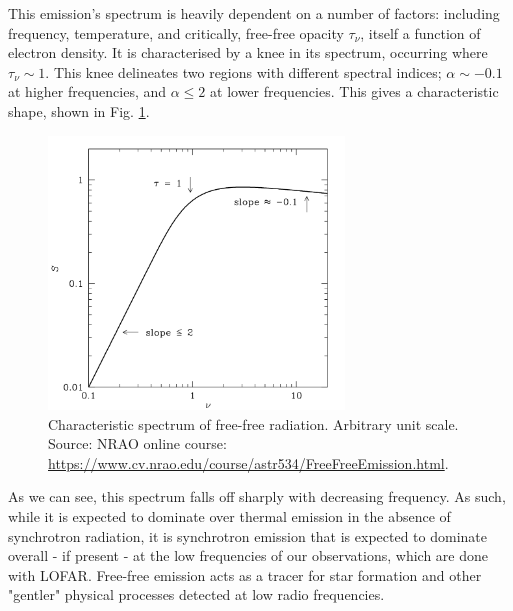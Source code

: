 \pg
This emission's spectrum is heavily dependent on a number of factors: including frequency, temperature, and critically, free-free opacity $\tau_\nu$, itself a function of electron density. It is characterised by a knee in its spectrum, occurring where $\tau_\nu\sim 1$. This knee delineates two regions with different spectral indices; $\alpha \sim -0.1$ at higher frequencies, and $\alpha \leq 2$ at lower frequencies. This gives a characteristic shape, shown in Fig. \ref{plot.freefree.spectrum}.
\begin{figure}[!h]
\centering
\includegraphics[width=0.7\textwidth]{images/freefree.png}
\caption{\label{plot.freefree.spectrum} Characteristic spectrum of free-free radiation. Arbitrary unit scale. Source: NRAO online course: \url{https://www.cv.nrao.edu/course/astr534/FreeFreeEmission.html}.}
\end{figure}

\pg
As we can see, this spectrum falls off sharply with decreasing frequency. As such, while it is expected to dominate over thermal emission in the absence of synchrotron radiation, it is synchrotron emission that is expected to dominate overall - if present - at the low frequencies of our observations, which are done with LOFAR. Free-free emission acts as a tracer for star formation and other "gentler" physical processes detected at low radio frequencies.
